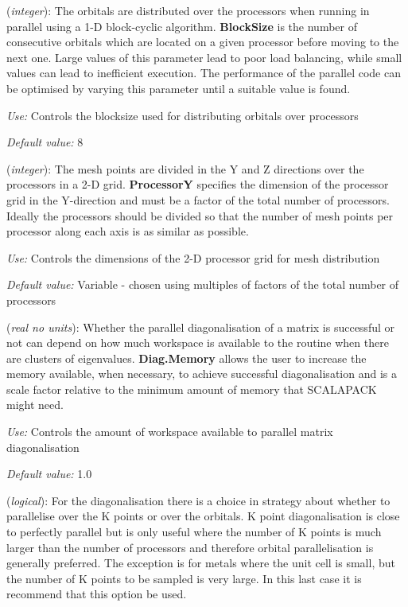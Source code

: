 \documentclass[11pt]{article}
\begin{document}
\begin{description}
\itemsep 10pt
\parsep 0pt

\item[{\bf BlockSize}] ({\it integer}):  The orbitals are distributed over the processors when
running in parallel using a 1-D block-cyclic algorithm. {\bf
BlockSize} is the number of consecutive orbitals which are located on
a given processor before moving to the next one. Large values of this
parameter lead to poor load balancing, while small values can lead to
inefficient execution.  The performance of the parallel code can be
optimised by varying this parameter until a suitable value is found.

{\it Use:} Controls the blocksize used for distributing orbitals over
processors

{\it Default value:}  8

\item[{\bf ProcessorY}] ({\it integer}):  The mesh points are divided in the Y and Z directions
over the processors in a 2-D grid. {\bf ProcessorY} specifies the
dimension of the processor grid in the Y-direction and must be a
factor of the total number of processors. Ideally the processors
should be divided so that the number of mesh points per processor
along each axis is as similar as possible.

{\it Use:} Controls the dimensions of the 2-D processor grid for mesh
distribution

{\it Default value:} Variable - chosen using multiples of factors of
  the total number of processors

\item[{\bf Diag.Memory}] ({\it real no units}):
Whether the parallel diagonalisation of a matrix is successful or not can 
depend on how much workspace is available to the routine when there are
clusters of eigenvalues. {\bf Diag.Memory} allows the user to increase
the memory available, when necessary, to achieve successful diagonalisation
and is a scale factor relative to the minimum amount of memory that
SCALAPACK might need. 

{\it Use:} Controls the amount of workspace available to parallel
matrix diagonalisation

{\it Default value:}  1.0

\item[{\bf Diag.ParallelOverK}] ({\it logical}):  For the diagonalisation there is a choice in strategy
about whether to parallelise over the K points or over the orbitals. K
point diagonalisation is close to perfectly parallel but is only
useful where the number of K points is much larger than the number of
processors and therefore orbital parallelisation is generally
preferred. The exception is for metals where the unit cell is small,
but the number of K points to be sampled is very large. In this last
case it is recommend that this option be used.


\end{description}
\end{document}

